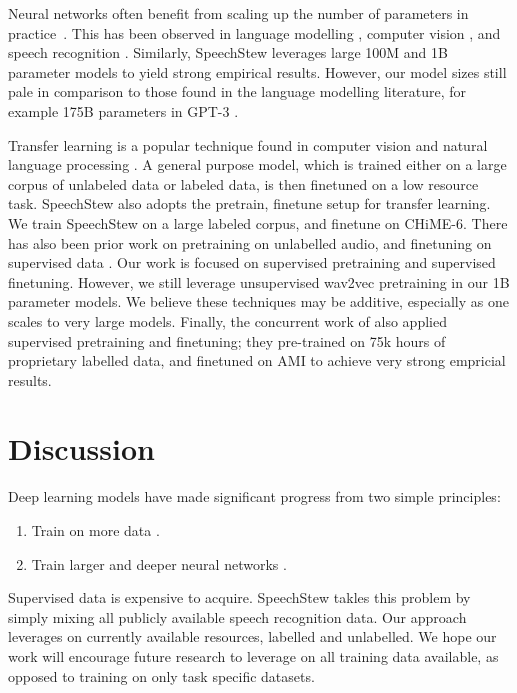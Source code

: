 \documentclass[a4paper]{article}
\begin{document}
Neural networks often benefit from scaling up the number of parameters in practice~\cite{nakkiran-iclr-2020}. This has been observed in language modelling \cite{devlin-naacl-2019,kaplan-arxiv-2020,brown-neurips-2020}, computer vision \cite{he-cvpr-2016,kaplan-arxiv-2020,chen-neurips-2020}, and speech recognition \cite{dean-nips-2012,zhang-arxiv-2020}. Similarly, SpeechStew leverages large 100M and 1B parameter models to yield strong empirical results. However, our model sizes still pale in comparison to those found in the language modelling literature, for example 175B parameters in GPT-3 \cite{brown-neurips-2020}.

Transfer learning is a popular technique found in computer vision \cite{jia-arxiv-2014,kornblith-cvpr-2019,kolesnikov-arxiv-2019} and natural language processing \cite{devlin-naacl-2019,brown-neurips-2020}. A general purpose model, which is trained either on a large corpus of unlabeled data or labeled data, is then finetuned on a low resource task. SpeechStew also adopts the pretrain, finetune setup for transfer learning. We train SpeechStew on a large labeled corpus, and finetune on CHiME-6.
There has also been prior work on pretraining on unlabelled audio, and finetuning on supervised data \cite{schneider-arxiv-2019,baevski-arxiv-2020}. Our work is focused on supervised pretraining and supervised finetuning. However, we still leverage unsupervised wav2vec pretraining in our 1B parameter models. We believe these techniques may be additive, especially as one scales to very large models. Finally, the concurrent work of \cite{kanda-arxiv-2021} also applied supervised pretraining and finetuning; they pre-trained on 75k hours of proprietary labelled data, and finetuned on AMI to achieve very strong empricial results.
 \section{Discussion}
        
Deep learning models have made significant progress from two simple principles:
\begin{enumerate}[noitemsep]
    \item Train on more data \cite{krizhevsky-nips-2012,brown-neurips-2020}.
    \item Train larger and deeper neural networks \cite{he-cvpr-2016,devlin-naacl-2019}.
\end{enumerate}

Supervised data is expensive to acquire. SpeechStew takles this problem by simply mixing all publicly available speech recognition data. Our approach leverages on currently available resources, labelled and unlabelled. We hope our work will encourage future research to leverage on all training data available, as opposed to training on only task specific datasets.
\end{document}
